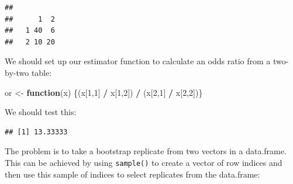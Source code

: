 \documentclass[12pt,a4paper]{book}
\newenvironment{Shaded}{\begin{snugshade}}{\end{snugshade}}
\newcommand{\ControlFlowTok}[1]{\textcolor[rgb]{0.13,0.29,0.53}{\textbf{#1}}}
\newcommand{\DataTypeTok}[1]{\textcolor[rgb]{0.13,0.29,0.53}{#1}}
\newcommand{\DecValTok}[1]{\textcolor[rgb]{0.00,0.00,0.81}{#1}}
\newcommand{\KeywordTok}[1]{\textcolor[rgb]{0.13,0.29,0.53}{\textbf{#1}}}
\newcommand{\NormalTok}[1]{#1}
\newcommand{\OperatorTok}[1]{\textcolor[rgb]{0.81,0.36,0.00}{\textbf{#1}}}
\newcommand{\OtherTok}[1]{\textcolor[rgb]{0.56,0.35,0.01}{#1}}
\newcommand{\StringTok}[1]{\textcolor[rgb]{0.31,0.60,0.02}{#1}}
\theoremstyle{definition}
\theoremstyle{definition}
\theoremstyle{definition}
\theoremstyle{remark}
\begin{document}
\begin{Shaded}
\end{Shaded}

\begin{verbatim}
##    
##      1  2
##   1 40  6
##   2 10 20
\end{verbatim}

We should set up our estimator function to calculate an odds ratio from
a two-by-two table:

\begin{Shaded}
\begin{Highlighting}[]
\NormalTok{or <-}\StringTok{ }\ControlFlowTok{function}\NormalTok{(x) \{(x[}\DecValTok{1}\NormalTok{,}\DecValTok{1}\NormalTok{] }\OperatorTok{/}\StringTok{ }\NormalTok{x[}\DecValTok{1}\NormalTok{,}\DecValTok{2}\NormalTok{]) }\OperatorTok{/}\StringTok{ }\NormalTok{(x[}\DecValTok{2}\NormalTok{,}\DecValTok{1}\NormalTok{] }\OperatorTok{/}\StringTok{ }\NormalTok{x[}\DecValTok{2}\NormalTok{,}\DecValTok{2}\NormalTok{])\}}
\end{Highlighting}
\end{Shaded}

We should test this:

\begin{Shaded}
\end{Shaded}

\begin{verbatim}
## [1] 13.33333
\end{verbatim}

The problem is to take a bootstrap replicate from two vectors in a
data.frame. This can be achieved by using \texttt{sample()} to create a
vector of row indices and then use this sample of indices to select
replicates from the data.frame:
\end{document}
